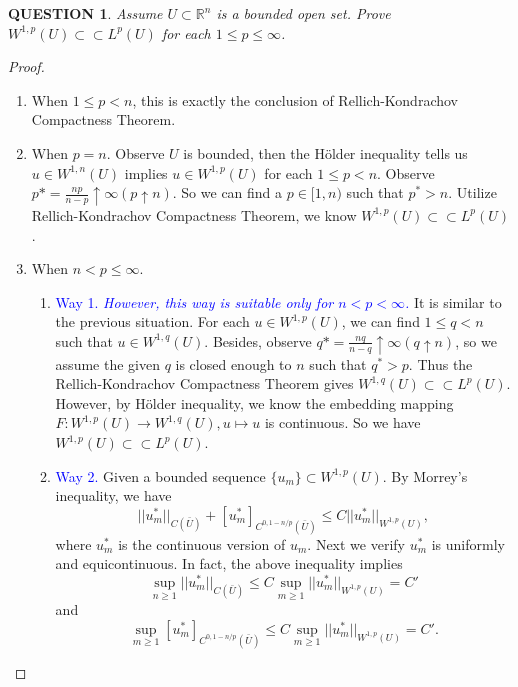 \documentclass[12pt]{article}
\renewcommand{\(}{\left(}%
\renewcommand{\)}{\right)}%
\renewcommand{\[}{\left[}%
\renewcommand{\]}{\right]}%
\renewcommand{\r}{\mathbb{R}}
\newtheorem{question}{QUESTION}[section]}
\newtheorem{proof}{Proof.}}
\begin{document}
  \begin{question}
   Assume $U\subset \r^n$ is a bounded open set. Prove $W^{1,p}(U)\subset\subset L^p(U)$ for each $1\leq p\leq \infty$.
  \end{question}
  \begin{proof}
   \begin{enumerate}
    \item When $1\leq p<n$, this is exactly the conclusion of {\sffamily Rellich-Kondrachov Compactness Theorem}.
    \item When $p=n$. Observe $U$ is bounded, then the H\"older inequality tells us $u\in W^{1,n}(U)$ implies $u\in W^{1,p}(U)$ for each $1\leq p<n$. Observe $p*=\frac{np}{n-p}\uparrow\infty(p\uparrow n)$. So we can find a $p\in[1,n)$ such that $p^*>n$. Utilize {\sffamily Rellich-Kondrachov Compactness Theorem}, we know $W^{1,p}(U)\subset\subset L^p(U)$.
    \item When $n<p\leq\infty$.
    \begin{enumerate}
     \item \textcolor{blue}{\sffamily Way 1.} \textcolor{blue}{\itshape However, this way is suitable only for $n<p<\infty$.} It is similar to the previous situation. For each $u\in W^{1,p}(U)$, we can find $1\leq q<n$ such that $u\in W^{1,q}(U)$. Besides, observe $q*=\frac{nq}{n-q}\uparrow\infty(q\uparrow n)$, so we assume the given $q$ is closed enough to $n$ such that $q^*>p$. Thus the {\sffamily Rellich-Kondrachov Compactness Theorem} gives $W^{1,q}(U)\subset\subset L^p(U)$. However, by {\sffamily H\"older inequality}, we know the embedding mapping $F:W^{1,p}(U)\to W^{1,q}(U),u\mapsto u$ is continuous. So we have $W^{1,p}(U)\subset\subset L^p(U)$.
     \item \textcolor{blue}{\sffamily Way 2.} Given a bounded sequence $\{u_m\}\subset W^{1,p}(U)$. By {\sffamily Morrey's inequality}, we have
     \begin{equation*}
      ||u_m^*||_{C(\bar{U})}+ [u_m^*]_{C^{0,1-n/p}(\bar{U})}\leq C||u_m^*||_{W^{1,p}(U)},
     \end{equation*}
     where $u^*_m$ is the continuous version of $u_m$. Next we verify $u_m^*$ is uniformly and equicontinuous. In fact, the above inequality implies
     \begin{equation*}
      \sup_{n\geq 1}||u_m^*||_{C(\bar{U})}\leq C\sup_{m\geq 1}||u_m^*||_{W^{1,p}(U)}=C'
     \end{equation*}
     and
     \begin{equation*}
      \sup_{m\geq 1}[u_m^*]_{C^{0,1-n/p}(\bar{U})}\leq C\sup_{m\geq 1}||u_m^*||_{W^{1,p}(U)}=C'.

\end{equation*}
\end{enumerate}
\end{enumerate}
\end{proof}
\end{document}
